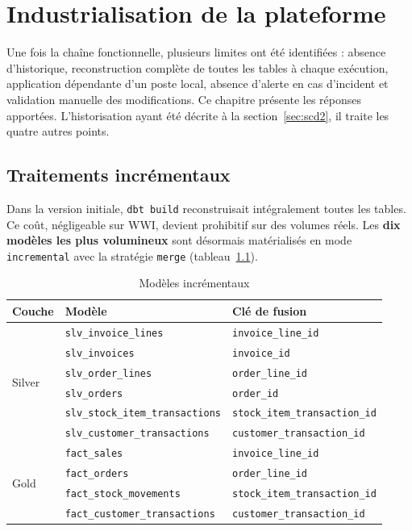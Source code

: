 \chapter{Industrialisation de la plateforme}
\label{ch:industrialisation}

Une fois la chaîne fonctionnelle, plusieurs limites ont été identifiées : absence d'historique,
reconstruction complète de toutes les tables à chaque exécution, application dépendante d'un poste
local, absence d'alerte en cas d'incident et validation manuelle des modifications. Ce chapitre présente
les réponses apportées. L'historisation ayant été décrite à la section~\ref{sec:scd2}, il traite les
quatre autres points.

\section{Traitements incrémentaux}
\label{sec:incremental}

Dans la version initiale, \texttt{dbt build} reconstruisait intégralement toutes les tables. Ce coût,
négligeable sur WWI, devient prohibitif sur des volumes réels. Les \textbf{dix modèles les plus
volumineux} sont désormais matérialisés en mode \texttt{incremental} avec la stratégie \texttt{merge}
(tableau~\ref{tab:incremental}).

\begin{table}[H]
\centering
\caption{Modèles incrémentaux}
\label{tab:incremental}
\begin{tabular}{@{}l l l@{}}
\toprule
\textbf{Couche} & \textbf{Modèle} & \textbf{Clé de fusion} \\
\midrule
\multirow{6}{*}{Silver} & \texttt{slv\_invoice\_lines} & \texttt{invoice\_line\_id} \\
 & \texttt{slv\_invoices} & \texttt{invoice\_id} \\
 & \texttt{slv\_order\_lines} & \texttt{order\_line\_id} \\
 & \texttt{slv\_orders} & \texttt{order\_id} \\
 & \texttt{slv\_stock\_item\_transactions} & \texttt{stock\_item\_transaction\_id} \\
 & \texttt{slv\_customer\_transactions} & \texttt{customer\_transaction\_id} \\
\midrule
\multirow{4}{*}{Gold} & \texttt{fact\_sales} & \texttt{invoice\_line\_id} \\
 & \texttt{fact\_orders} & \texttt{order\_line\_id} \\
 & \texttt{fact\_stock\_movements} & \texttt{stock\_item\_transaction\_id} \\
 & \texttt{fact\_customer\_transactions} & \texttt{customer\_transaction\_id} \\
\bottomrule
\end{tabular}
\end{table}

